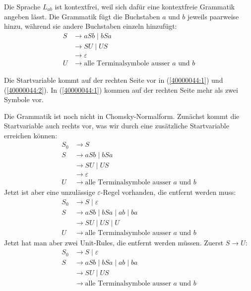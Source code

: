 \begin{loesung}
\begin{teilaufgaben}
\item
Die Sprache $L_{ab}$ ist kontextfrei, weil sich dafür eine kontextfreie
Grammatik angeben lässt.
Die Grammatik fügt die Buchstaben $a$ und $b$ jeweils paarweise
hinzu, während sie andere Buchstaben einzeln hinzufügt:
\begin{align}
S&\rightarrow aSb\;|\; bSa \label{40000044:1}\\
 &\rightarrow SU \;|\; US  \label{40000044:2}\\
 &\rightarrow \varepsilon  \label{40000044:3}\\
U&\rightarrow \text{alle Terminalsymbole ausser $a$ und $b$} \label{40000044:4}
\end{align}
\item
Die Startvariable kommt auf der rechten Seite vor in (\ref{40000044:1})
und (\ref{40000044:2}).
In (\ref{40000044:1}) kommen auf der rechten Seite mehr als zwei Symbole vor.
\item
Die Grammatik ist noch nicht in Chomsky-Normalform.
Zunächst kommt die Startvariable auch rechts vor, was wir durch eine
zusätzliche Startvariable erreichen können:
\begin{align*}
S_0&\rightarrow S\\
S  &\rightarrow aSb\;|\; bSa\\
   &\rightarrow SU \;|\; US\\
   &\rightarrow \varepsilon\\
U  &\rightarrow \text{alle Terminalsymbole ausser $a$ und $b$}
\end{align*}
Jetzt ist aber eine unzulässige $\varepsilon$-Regel vorhanden, die entfernt
werden muss:
\begin{align*}
S_0&\rightarrow S\;|\;\varepsilon\\
S  &\rightarrow aSb\;|\; bSa\;|\;ab\;|\;ba\\
   &\rightarrow SU \;|\; US\;|\;U\;\\
U  &\rightarrow \text{alle Terminalsymbole ausser $a$ und $b$}
\end{align*}
Jetzt hat man aber zwei Unit-Rules, die entfernt werden müssen.
Zuerst $S\rightarrow U$:
\begin{align*}
S_0&\rightarrow S\;|\;\varepsilon\\
S  &\rightarrow aSb\;|\; bSa\;|\;ab\;|\;ba\\
   &\rightarrow SU \;|\; US\\
   &\rightarrow \text{alle Terminalsymbole ausser $a$ und $b$}\\

\end{align*}
\end{teilaufgaben}
\end{loesung}

